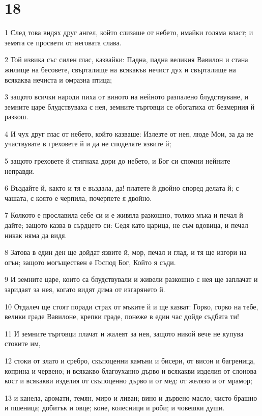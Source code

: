 \chapter{18}

\par 1 След това видях друг ангел, който слизаше от небето, имайки голяма власт; и земята се просвети от неговата слава.
\par 2 Той извика със силен глас, казвайки: Падна, падна великия Вавилон и стана жилище на бесовете, свърталище на всякакъв нечист дух и свърталище на всякаква нечиста и омразна птица;
\par 3 защото всички народи пиха от виното на нейното разпалено блудствуване, и земните царе блудствуваха с нея, земните търговци се обогатиха от безмерния й разкош.
\par 4 И чух друг глас от небето, който казваше: Излезте от нея, люде Мои, за да не участвувате в греховете й и да не споделяте язвите й;
\par 5 защото греховете й стигнаха дори до небето, и Бог си спомни нейните неправди.
\par 6 Въздайте й, както и тя е въздала, да! платете й двойно според делата й; с чашата, с която е черпила, почерпете я двойно.
\par 7 Колкото е прославила себе си и е живяла разкошно, толкоз мъка и печал й дайте; защото казва в сърдцето си: Седя като царица, не съм вдовица, и печал никак няма да видя.
\par 8 Затова в един ден ще дойдат язвите й, мор, печал и глад, и тя ще изгори на огън; защото могъществен е Господ Бог, Който я съди.
\par 9 И земните царе, които са блудствували и живели разкошно с нея ще заплачат и заридаят за нея, когато видят дима от изгарянето й.
\par 10 Отдалеч ще стоят поради страх от мъките й и ще казват: Горко, горко на тебе, велики граде Вавилоне, крепки граде, понеже в един час дойде съдбата ти!
\par 11 И земните търговци плачат и жалеят за нея, защото никой вече не купува стоките им,
\par 12 стоки от злато и сребро, скъпоценни камъни и бисери, от висон и багреница, коприна и червено; и всякакво благоуханно дърво и всякакви изделия от слонова кост и всякакви изделия от скъпоценно дърво и от мед: от желязо и от мрамор;
\par 13 и канела, аромати, темян, миро и ливан; вино и дървено масло; чисто брашно и пшеница; добитък и овце; коне, колесници и роби; и човешки души.
